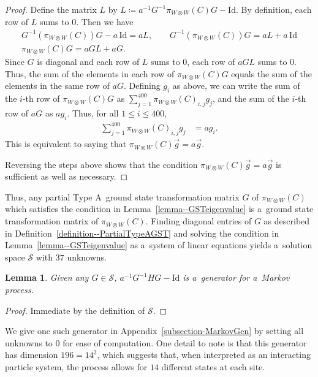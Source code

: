\documentclass[pdftex]{sigma}
\numberwithin{equation}{section}
\newtheorem{Lemma}[Theorem]{Lemma}
\theoremstyle{definition}
\begin{document}
\begin{proof}
 Define the matrix $L$ by $ L \coloneqq a^{-1}G^{-1}\pi_{W \otimes W}(C)G - \mathrm{Id}$.
 By definition, each row of $L$ sums to $0$. Then we have
 \begin{gather*}
 G^{-1}(\pi_{W \otimes W}(C))G - a\,\mathrm{Id} = aL ,\qquad
 G^{-1}(\pi_{W \otimes W}(C))G = aL + a\,\mathrm{Id} \\
 \pi_{W \otimes W}(C)G = aGL + aG.
 \end{gather*}
 Since $G$ is diagonal and each row of $L$ sums to $0$, each row of $aGL$ sums to $0$. Thus, the sum of the elements in each row of $\pi_{W \otimes W}(C) G$ equals the sum of the elements in the same row of $aG$. Defining $g_i$ as above, we can write the sum of the $i$-th row of $\pi_{W \otimes W}(C)G$ as $\sum_{j=1}^{400} \pi_{W \otimes W}(C)_{i,j} g_j$, and the sum of the $i$-th row of $aG$ as $ag_i$. Thus, for all $1 \le i \le 400$,
 \begin{align*}
 \sum_{j=1}^{400} \pi_{W \otimes W}(C)_{i,j} g_j &= ag_i.
 \end{align*}
 This is equivalent to saying that $\pi_{W \otimes W}(C) \vec{g} = a\vec{g}$.

 Reversing the steps above shows that the condition $\pi_{W \otimes W}(C)\vec{g} = a\vec{g}$ is sufficient as well as necessary.
\end{proof}

Thus, any partial Type A~ground state transformation matrix $G$ of $\pi_{W \otimes W}(C)$ which satisfies the condition in Lemma~\ref{lemma--GSTeigenvalue} is a~ground state transformation matrix of $\pi_{W \otimes W}(C)$. Finding diagonal entries of $G$ as described in Definition~\ref{definition--PartialTypeAGST} and solving the condition in Lemma~\ref{lemma--GSTeigenvalue} as a~system of linear equations yields a~solution space $\mathcal{S}$ with $37$ unknowns.

\begin{Lemma}
 Given any $G \in \mathcal{S}$, $a^{-1}G^{-1}HG - \mathrm{Id}$ is a~generator for a~Markov process.
\end{Lemma}
\begin{proof}
 Immediate by the definition of $\mathcal{S}$.
\end{proof}
We give one such generator in Appendix~\ref{subsection-MarkovGen} by setting all unknowns to $0$ for ease of computation. One detail to note is that this generator has dimension $196 = 14^2$, which suggests that, when interpreted as an interacting particle system, the process allows for $14$ different states at each site.
\end{document}
